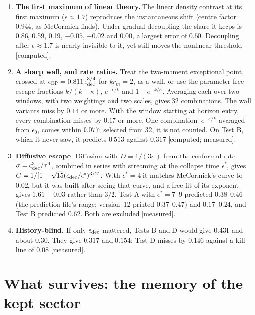 \documentclass[11pt]{article}
\newcommand{\grade}[1]{\textsf{\small[#1]}}
\begin{document}
\begin{enumerate}
\item \textbf{The first maximum of linear theory.} The linear density contrast at its first maximum ($\epsilon\approx1.7$) reproduces the instantaneous shift (centre factor $0.944$, as McCormick finds). Under gradual decoupling the share it keeps is 0.86, 0.59, 0.19, $-0.05$, $-0.02$ and 0.00, a largest error of $0.50$. Decoupling after $\epsilon\approx1.7$ is nearly invisible to it, yet still moves the nonlinear threshold \grade{computed}.
\item \textbf{A sharp wall, and rate ratios.} Treat the two-moment exceptional point, crossed at $\epsilon_{\rm EP}=0.811\,\epsilon_{\rm dec}^{3/4}$ for $kr_m=2$, as a wall, or use the parameter-free escape fractions $k/(k+\kappa)$, $e^{-\kappa/k}$ and $1-e^{-k/\kappa}$. Averaging each over two windows, with two weightings and two scales, gives 32 combinations. The wall variants miss by $0.14$ or more. With the window starting at horizon entry, every combination misses by $0.17$ or more. One combination, $e^{-\kappa/k}$ averaged from $\epsilon_0$, comes within $0.077$; selected from 32, it is not counted. On Test B, which it never saw, it predicts $0.513$ against $0.317$ \grade{computed; measured}.
\item \textbf{Diffusive escape.} Diffusion with $D=1/(3\sigma)$ from the conformal rate $\sigma=\epsilon_{\rm dec}^3/\tau^4$, combined in series with streaming at the collapse time $\epsilon^\ast$, gives $G=1/[1+\sqrt{15}(\epsilon_{\rm dec}/\epsilon^\ast)^{3/2}]$. With $\epsilon^\ast=4$ it matches McCormick's curve to $0.02$, but it was built after seeing that curve, and a free fit of its exponent gives $1.61\pm0.03$ rather than $3/2$. Test A with $\epsilon^\ast=7$--$9$ predicted $0.38$--$0.46$ (the prediction file's range; version~12 printed $0.37$--$0.47$) and $0.17$--$0.24$, and Test B predicted $0.62$. Both are excluded \grade{measured}.
\item \textbf{History-blind.} If only $\epsilon_{\rm dec}$ mattered, Tests B and D would give $0.431$ and about $0.30$. They give $0.317$ and $0.154$; Test D misses by $0.146$ against a kill line of $0.08$ \grade{measured}.
\end{enumerate}

\section{What survives: the memory of the kept sector}\label{sec:memory}
\end{document}

